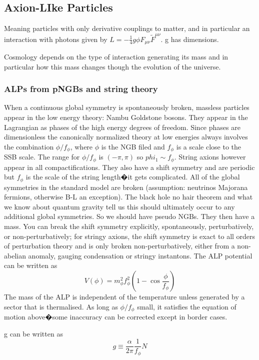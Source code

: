 \documentclass[11pt]{book}
\begin{document}
\subsection{Axion-LIke Particles}
Meaning particles with only derivative couplings to matter, and in particular an interaction with photons given by $L = -\frac{1}{4}g\phi F_{\mu\nu}\tilde F^{\mu\nu}$. g has dimensions.

Cosmology depends on the type of interaction generating its mass and in particular how this mass changes though the evolution of the universe.
\subsubsection{ALPs from pNGBs and string theory}

When a continuous global symmetry is spontaneously broken, massless particles appear in the low energy theory: Nambu Goldstone bosons. They appear in the Lagrangian as phases of the high energy degrees of freedom. Since phases are dimensionless the canonically normalized theory at low energies always involves the combination $\phi/f_{\phi}$, where $\phi$ is the NGB filed and $f_{\phi}$ is a scale close to the SSB scale. The range for $\phi/f_{\phi}$ is $(-\pi, \pi)$ so $phi_1 \sim f_\phi$. String axions however appear in all compactifications. They also have a shift symmetry and are periodic but $f_\phi$ is the scale of the string length�it gets complicated.
All of the global symmetries in the standard model are broken (assumption: neutrinos Majorana fermions, otherwise B-L an exception). The black hole no hair theorem and what we know about quantum gravity tell us this should ultimately occur to any additional global symmetries. So we should have pseudo NGBs. They then have a mass.
You can break the shift symmetry explicitly, spontaneously, perturbatively, or non-perturbatively; for stringy axions, the shift symmetry is exact to all orders of perturbation theory and is only broken non-perturbatively, either from a non-abelian anomaly, gauging condensation or stringy instantons. The ALP potential can be written as
\[
V(\phi) = m_\phi^2 f_\phi^2 (1-\cos{\frac{\phi}{f_\phi}})
\]
The mass of the ALP is independent of the temperature unless generated by a sector that is thermalised. As long as $\phi/f_{\phi}$ small, it satisfies the equation of motion above�some inaccuracy can be corrected except in border cases.

g can be written as 
\[
g \equiv \frac{\alpha}{2\pi}\frac{1}{f_\phi}N
\]
\end{document}

